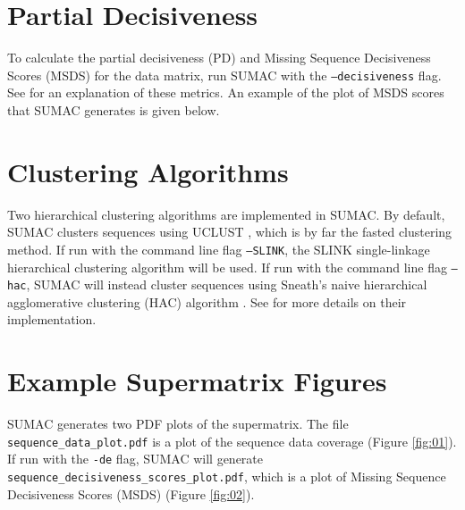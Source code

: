 \documentclass[10pt]{report}
\begin{document}
\section{Partial Decisiveness}
To calculate the partial decisiveness (PD) and Missing Sequence Decisiveness Scores (MSDS)
for the data matrix, run SUMAC with the \texttt{--decisiveness} flag.
See \citet{sumac} for an explanation of these metrics. 
An example of the plot of MSDS scores that SUMAC generates is given below.

\section{Clustering Algorithms}
Two hierarchical clustering algorithms are implemented in SUMAC.
By default, SUMAC clusters sequences using UCLUST \citep{edgar2010search}, which is by far the fasted clustering method.
If run with the command line flag \texttt{--SLINK}, the SLINK single-linkage hierarchical clustering algorithm \citep{Sibson1973} will be used.
If run with the command line flag \texttt{--hac}, SUMAC will instead cluster sequences using Sneath's naive
hierarchical agglomerative clustering (HAC) algorithm \citep{Sneath1957}.
See \citet{sumac} for more details on their implementation.

\section{Example Supermatrix Figures}

SUMAC generates two PDF plots of the supermatrix. The file \texttt{sequence\_data\_plot.pdf} is a plot of the sequence data coverage (Figure \ref{fig:01}). 
If run with the \texttt{-de} flag, SUMAC will generate \texttt{sequence\_decisiveness\_scores\_plot.pdf}, which is a plot of 
Missing Sequence Decisiveness Scores (MSDS) (Figure \ref{fig:02}).
\end{document}
